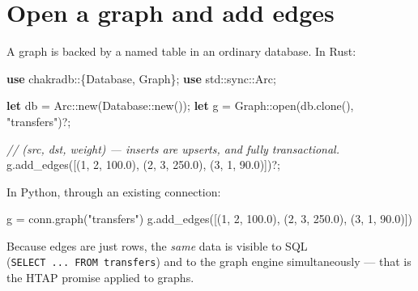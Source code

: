 \documentclass[
  11pt,
  openany]{book}
\newenvironment{Shaded}{}{}
\newcommand{\CommentTok}[1]{\textcolor[rgb]{0.38,0.63,0.69}{\textit{#1}}}
\newcommand{\DecValTok}[1]{\textcolor[rgb]{0.25,0.63,0.44}{#1}}
\newcommand{\FloatTok}[1]{\textcolor[rgb]{0.25,0.63,0.44}{#1}}
\newcommand{\KeywordTok}[1]{\textcolor[rgb]{0.00,0.44,0.13}{\textbf{#1}}}
\newcommand{\NormalTok}[1]{#1}
\newcommand{\OperatorTok}[1]{\textcolor[rgb]{0.40,0.40,0.40}{#1}}
\newcommand{\PreprocessorTok}[1]{\textcolor[rgb]{0.74,0.48,0.00}{#1}}
\newcommand{\StringTok}[1]{\textcolor[rgb]{0.25,0.44,0.63}{#1}}
\begin{document}
\section{Open a graph and add edges}\label{open-a-graph-and-add-edges}

A graph is backed by a named table in an ordinary database. In Rust:

\begin{Shaded}
\begin{Highlighting}[]
\KeywordTok{use} \PreprocessorTok{chakradb::}\OperatorTok{\{}\NormalTok{Database}\OperatorTok{,}\NormalTok{ Graph}\OperatorTok{\};}
\KeywordTok{use} \PreprocessorTok{std::sync::}\NormalTok{Arc}\OperatorTok{;}

\KeywordTok{let}\NormalTok{ db }\OperatorTok{=} \PreprocessorTok{Arc::}\NormalTok{new(}\PreprocessorTok{Database::}\NormalTok{new())}\OperatorTok{;}
\KeywordTok{let}\NormalTok{ g }\OperatorTok{=} \PreprocessorTok{Graph::}\NormalTok{open(db}\OperatorTok{.}\NormalTok{clone()}\OperatorTok{,} \StringTok{"transfers"}\NormalTok{)}\OperatorTok{?;}

\CommentTok{// (src, dst, weight) — inserts are upserts, and fully transactional.}
\NormalTok{g}\OperatorTok{.}\NormalTok{add\_edges([(}\DecValTok{1}\OperatorTok{,} \DecValTok{2}\OperatorTok{,} \DecValTok{100.0}\NormalTok{)}\OperatorTok{,}\NormalTok{ (}\DecValTok{2}\OperatorTok{,} \DecValTok{3}\OperatorTok{,} \DecValTok{250.0}\NormalTok{)}\OperatorTok{,}\NormalTok{ (}\DecValTok{3}\OperatorTok{,} \DecValTok{1}\OperatorTok{,} \DecValTok{90.0}\NormalTok{)])}\OperatorTok{?;}
\end{Highlighting}
\end{Shaded}

In Python, through an existing connection:

\begin{Shaded}
\begin{Highlighting}[]
\NormalTok{g }\OperatorTok{=}\NormalTok{ conn.graph(}\StringTok{"transfers"}\NormalTok{)}
\NormalTok{g.add\_edges([(}\DecValTok{1}\NormalTok{, }\DecValTok{2}\NormalTok{, }\FloatTok{100.0}\NormalTok{), (}\DecValTok{2}\NormalTok{, }\DecValTok{3}\NormalTok{, }\FloatTok{250.0}\NormalTok{), (}\DecValTok{3}\NormalTok{, }\DecValTok{1}\NormalTok{, }\FloatTok{90.0}\NormalTok{)])}
\end{Highlighting}
\end{Shaded}

Because edges are just rows, the \emph{same} data is visible to SQL
(\texttt{SELECT\ ...\ FROM\ transfers}) and to the graph engine
simultaneously --- that is the HTAP promise applied to graphs.
\end{document}
